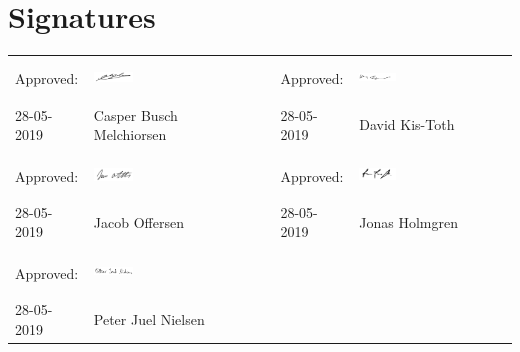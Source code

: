 \section*{Signatures}


\begin{table}[H]
\begin{tabular}{lllll}
Approved:  & \includegraphics[width=0.25\textwidth, height=10mm]{pictures/general/casper.PNG} &  & Approved:  & \includegraphics[width=0.25\textwidth, height=10mm]{pictures/general/david.PNG} \\ \cline{2-2} \cline{5-5} 
28-05-2019 & Casper Busch Melchiorsen &  & 28-05-2019 & David Kis-Toth \\
           &                          &  &            &                \\
Approved:  & \includegraphics[width=0.25\textwidth, height=10mm]{pictures/general/jacob.PNG} &  & Approved:  &  \includegraphics[width=0.25\textwidth, height=10mm]{pictures/general/jonas.PNG}\\ \cline{2-2} \cline{5-5} 
28-05-2019 & Jacob Offersen           &  & 28-05-2019 & Jonas Holmgren \\
           &                          &  &            &                \\
Approved:  & \includegraphics[width=0.25\textwidth, height=10mm]{pictures/general/peter.PNG}&  &            &                \\ \cline{2-2}
28-05-2019 & Peter Juel Nielsen       &  &            &               
\end{tabular}
\end{table}
